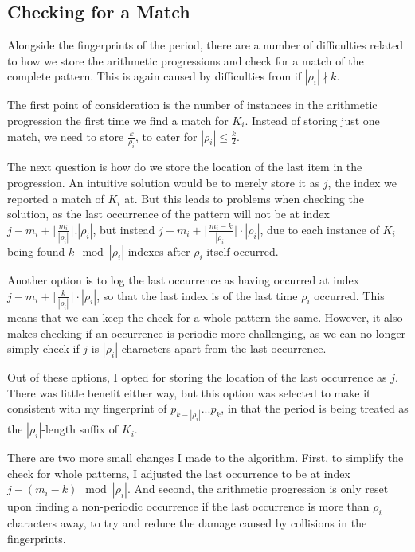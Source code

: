 \documentclass[ %
                    author={Dominic Joseph Moylett},
                    degree={MEng},
                     title={Dictionary Matching with Fingerprints},
                  subtitle={An Empirical Analysis},
                      type={Research},
                      year={2014} ]{dissertation}
\begin{document}
\subsection{Checking for a Match}

Alongside the fingerprints of the period, there are a number of difficulties related to how we store the arithmetic progressions and check for a match of the complete pattern. This is again caused by difficulties from if $|\rho_i| \nmid k$.

The first point of consideration is the number of instances in the arithmetic progression the first time we find a match for $K_i$. Instead of storing just one match, we need to store $\frac{k}{\rho_i}$, to cater for $|\rho_i| \leq \frac{k}{2}$.

The next question is how do we store the location of the last item in the progression. An intuitive solution would be to merely store it as $j$, the index we reported a match of $K_i$ at. But this leads to problems when checking the solution, as the last occurrence of the pattern will not be at index $j - m_i + \lfloor\frac{m_i}{|\rho_i|}\rfloor.|\rho_i|$, but instead $j - m_i + \lfloor\frac{m_i - k}{|\rho_i|}\rfloor\cdot|\rho_i|$, due to each instance of $K_i$ being found $k \mod |\rho_i|$ indexes after $\rho_i$ itself occurred.

Another option is to log the last occurrence as having occurred at index $j - m_i + \lfloor\frac{k}{|\rho_i|}\rfloor\cdot|\rho_i|$, so that the last index is of the last time $\rho_i$ occurred. This means that we can keep the check for a whole pattern the same. However, it also makes checking if an occurrence is periodic more challenging, as we can no longer simply check if $j$ is $|\rho_i|$ characters apart from the last occurrence.

Out of these options, I opted for storing the location of the last occurrence as $j$. There was little benefit either way, but this option was selected to make it consistent with my fingerprint of $p_{k - |\rho_i|}...p_k$, in that the period is being treated as the $|\rho_i|$-length suffix of $K_i$.

There are two more small changes I made to the algorithm. First, to simplify the check for whole patterns, I adjusted the last occurrence to be at index $j - (m_i - k) \mod |\rho_i|$. And second, the arithmetic progression is only reset upon finding a non-periodic occurrence if the last occurrence is more than $\rho_i$ characters away, to try and reduce the damage caused by collisions in the fingerprints.
\end{document}
